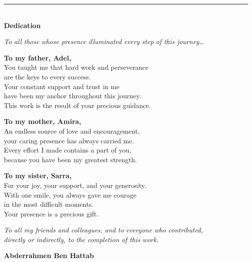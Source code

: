 ﻿%

\newpage
\thispagestyle{empty}
\begin{center}
  \rule{\linewidth}{1.2pt}\\[0.4cm]
  {\fontsize{20}{24}\selectfont \textbf{Dedication}}\\[0.5cm]
\end{center}
\begin{center}
\itshape
{\fontsize{12}{16}\selectfont
\textit{To all those whose presence illuminated every step of this journey\ldots}
}
\vspace{0.6cm}

{\fontsize{12}{16}\selectfont
\textbf{To my father, Adel,}\\[0.2cm]
You taught me that hard work and perseverance\\
are the keys to every success.\\
Your constant support and trust in me\\
have been my anchor throughout this journey.\\
This work is the result of your precious guidance.
}
\vspace{0.6cm}

{\fontsize{12}{16}\selectfont
\textbf{To my mother, Amira,}\\[0.2cm]
An endless source of love and encouragement,\\
your caring presence has always carried me.\\
Every effort I made contains a part of you,\\
because you have been my greatest strength.
}
\vspace{0.6cm}

{\fontsize{12}{16}\selectfont
\textbf{To my sister, Sarra,}\\[0.2cm]
For your joy, your support, and your generosity.\\
With one smile, you always gave me courage\\
in the most difficult moments.\\
Your presence is a precious gift.
}
\vspace{0.6cm}



{\fontsize{12}{16}\selectfont
\textit{To all my friends and colleagues, and to everyone who contributed,}\\
\textit{directly or indirectly, to the completion of this work.}
}
\end{center}
\vfill
\begin{flushright}
  {\fontsize{12}{14.4}\selectfont \textbf{Abderrahmen Ben Hattab}}
\end{flushright}



